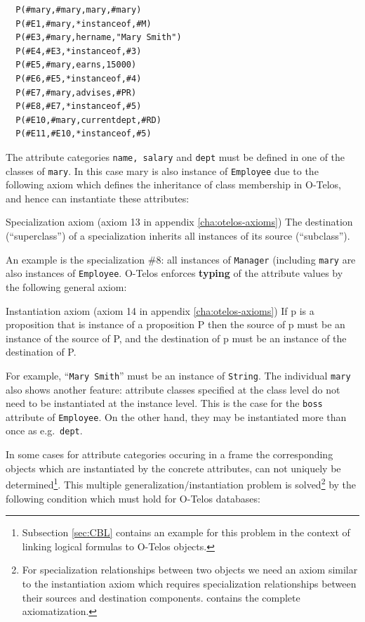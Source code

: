 \begin{verbatim}
  P(#mary,#mary,mary,#mary)
  P(#E1,#mary,*instanceof,#M)
  P(#E3,#mary,hername,"Mary Smith")
  P(#E4,#E3,*instanceof,#3)
  P(#E5,#mary,earns,15000)
  P(#E6,#E5,*instanceof,#4)
  P(#E7,#mary,advises,#PR)
  P(#E8,#E7,*instanceof,#5)
  P(#E10,#mary,currentdept,#RD)
  P(#E11,#E10,*instanceof,#5)
\end{verbatim}


  The attribute categories {\tt name, salary} and {\tt dept} must be defined in one of
    the classes of {\tt mary}. In this case mary is also instance of {\tt Employee} due to
the following axiom which defines the inheritance of class membership in
O-Telos, and hence can instantiate these attributes:

\begin{axiom}{Specialization axiom (axiom 13 in appendix \ref{cha:otelos-axioms})}
  The destination (``superclass'') of a specialization inherits all
  instances of its source (``subclass'').
\end{axiom}

  An example is the specialization \#8: all instances
of {\tt Manager} (including
          {\tt mary} are also instances
of {\tt Employee}.
O-Telos enforces {\bf typing} of the
attribute values by the following general axiom:


\begin{axiom}{Instantiation axiom (axiom 14 in appendix \ref{cha:otelos-axioms})}
If p is a proposition that is instance of a proposition P then the source
of p must be an instance of the source of P, and the destination of p must
be an instance of the destination of P.
\end{axiom}

For example, ``{\tt Mary Smith}'' must be an instance of {\tt String}. The individual
{\tt mary} also shows another feature: attribute classes specified at the class
level do not need to be instantiated at the instance level. This is the
case for the {\tt boss} attribute of {\tt Employee}. On the other hand, they may be
instantiated more than once as e.g.\ {\tt dept}.


In some cases for attribute categories occuring in a frame the
corresponding objects which are instantiated by the concrete attributes,
can not uniquely be determined\footnote{Subsection \ref{sec:CBL} contains an
  example for this problem in the context of linking logical formulas
  to O-Telos objects.}. This multiple generalization/instan\-tia\-tion
problem is solved\footnote{For specialization relationships between
  two objects we need an axiom similar to the instantiation axiom
  which requires specialization relationships between their sources
  and destination components. \cite{jeus92} contains the complete
  axiomatization.} by the following condition which must hold for
O-Telos databases:


